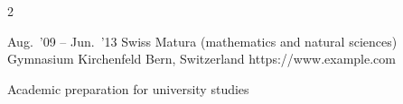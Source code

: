 \documentclass[a4paper,11pt]{article}
\newlength{\sidebarW}
\begin{document}
\begin{paracol}{2}
\begin{minipage}[t]{\dimexpr\paperwidth-\sidebarW-22pt\relax}
    \begin{education}{Aug.~'09 -- Jun.~'13}%
                     {Swiss Matura (mathematics and natural sciences)}%
                     {Gymnasium Kirchenfeld}%
                     {Bern, Switzerland}%
                     {https://www.example.com}
      \item Academic preparation for university studies
    \end{education}

  \end{minipage}%

\end{paracol}
\end{document}
